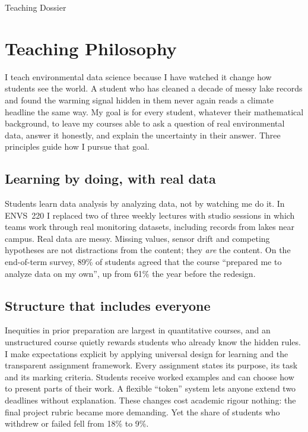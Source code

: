 \begin{applicationdocument}[
  contents,
  numbered,
  subtitle = {Prepared for the position of \PositionSummary},
]{Teaching Dossier}


\section{Teaching Philosophy}\label{sec:philosophy}

I teach environmental data science because I have watched it change how
students see the world. A student who has cleaned a decade of messy lake
records and found the warming signal hidden in them never again reads a
climate headline the same way. My goal is for every student, whatever their
mathematical background, to leave my courses able to ask a question of
real environmental data, answer it honestly, and explain the
uncertainty in their answer. Three principles guide how I pursue that goal.

\subsection{Learning by doing, with real data}
Students learn data analysis by analyzing data, not by watching me do it.
In ENVS~220 I replaced two of three weekly lectures with studio sessions in
which teams work through real monitoring datasets, including records from
lakes near campus. Real data are messy. Missing values, sensor drift and
competing hypotheses are not distractions from the content; they \emph{are}
the content. On the end-of-term survey, 89\% of students agreed that the
course ``prepared me to analyze data on my own'', up from 61\% the year
before the redesign.

\subsection{Structure that includes everyone}
Inequities in prior preparation are largest in quantitative courses, and an
unstructured course quietly rewards students who already know the hidden
rules. I make expectations explicit by applying universal design for
learning and the transparent assignment framework. Every assignment states
its purpose, its task and its marking criteria. Students
receive worked examples and can choose how to present parts of their
work. A flexible ``token'' system lets anyone extend two deadlines without
explanation. These changes cost academic rigour nothing: the final project rubric
became more demanding. Yet the share of students who withdrew or failed fell
from 18\% to 9\%.


\end{applicationdocument}
